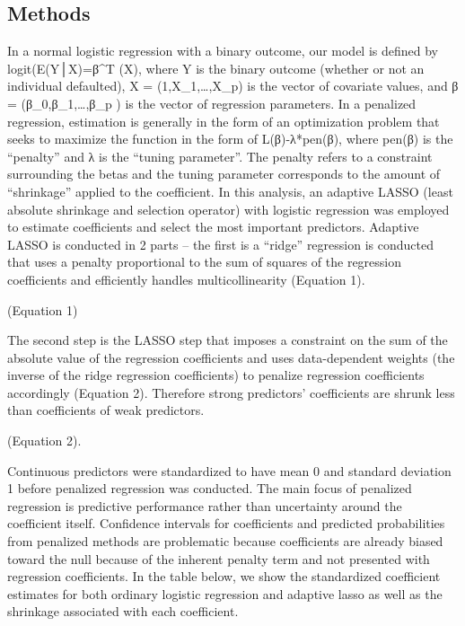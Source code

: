\documentclass[
]{article}
\begin{document}
\hypertarget{methods-1}{%
\subsection{Methods}\label{methods-1}}

In a normal logistic regression with a binary outcome, our model is defined by logit(E(Y│X)=β\^{}T (X), where Y is the binary outcome (whether or not an individual defaulted), X = (1,X\_1,\ldots,X\_p) is the vector of covariate values, and β = (β\_0,β\_1,\ldots,β\_p ) is the vector of regression parameters. In a penalized regression, estimation is generally in the form of an optimization problem that seeks to maximize the function in the form of L(β)-λ*pen(β), where pen(β) is the ``penalty'' and λ is the ``tuning parameter''. The penalty refers to a constraint surrounding the betas and the tuning parameter corresponds to the amount of ``shrinkage'' applied to the coefficient. In this analysis, an adaptive LASSO (least absolute shrinkage and selection operator) with logistic regression was employed to estimate coefficients and select the most important predictors. Adaptive LASSO is conducted in 2 parts -- the first is a ``ridge'' regression is conducted that uses a penalty proportional to the sum of squares of the regression coefficients and efficiently handles multicollinearity (Equation 1).

(Equation 1)

The second step is the LASSO step that imposes a constraint on the sum of the absolute value of the regression coefficients and uses data-dependent weights (the inverse of the ridge regression coefficients) to penalize regression coefficients accordingly (Equation 2). Therefore strong predictors' coefficients are shrunk less than coefficients of weak predictors.

(Equation 2).

Continuous predictors were standardized to have mean 0 and standard deviation 1 before penalized regression was conducted. The main focus of penalized regression is predictive performance rather than uncertainty around the coefficient itself. Confidence intervals for coefficients and predicted probabilities from penalized methods are problematic because coefficients are already biased toward the null because of the inherent penalty term and not presented with regression coefficients. In the table below, we show the standardized coefficient estimates for both ordinary logistic regression and adaptive lasso as well as the shrinkage associated with each coefficient.
\end{document}
